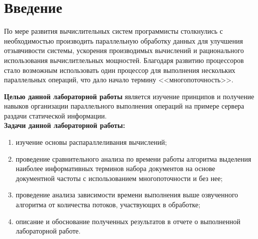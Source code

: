 \newpage
\chapter*{Введение}
По мере развития вычислительных систем программисты столкнулись с необходимостью производить параллельную обработку данных для улучшения отзывчивости системы, ускорения производимых вычислений и рационального использования вычислитлельных мощностей. Благодаря развитию процессоров стало возможным использовать один процессор для выполнения нескольких параллельных операций, что дало начало термину <<многопоточность>>.

\textbf{Целью данной лабораторной работы} является изучение принципов и получение навыков организации  параллельного выполнения операций на примере сервера раздачи статической информации.\\

\textbf{Задачи данной лабораторной работы:}
\begin{enumerate}
	\item изучение основы распараллеливания вычислений;
	\item проведение сравнительного анализа по времени работы алгоритма выделения наиболее информативных терминов набора документов на основе документной частоты с использованием многопоточности и без нее;
	\item проведение анализа зависимости времени выполнения выше озвученного алгоритма от количества потоков, участвующих в обработке;
	\item описание и обоснование полученных результатов в отчете о выполненной лабораторной работе.
\end{enumerate}
